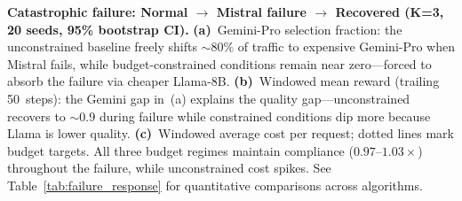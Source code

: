 
\textbf{Catastrophic failure: Normal $\to$ Mistral failure $\to$ Recovered
(K=3, 20 seeds, 95\% bootstrap CI).}
\textbf{(a)}~Gemini-Pro selection fraction: the unconstrained baseline freely
shifts ${\sim}80\%$ of traffic to expensive Gemini-Pro when Mistral fails, while
budget-constrained conditions remain near zero---forced to absorb the failure
via cheaper Llama-8B.
\textbf{(b)}~Windowed mean reward (trailing 50~steps): the Gemini gap in~(a)
explains the quality gap---unconstrained recovers to ${\sim}0.9$ during failure
while constrained conditions dip more because Llama is lower quality.
\textbf{(c)}~Windowed average cost per request; dotted lines mark budget targets.
All three budget regimes maintain compliance ($0.97$--$1.03\times$) throughout
the failure, while unconstrained cost spikes.
See Table~\ref{tab:failure_response} for quantitative comparisons across algorithms.
